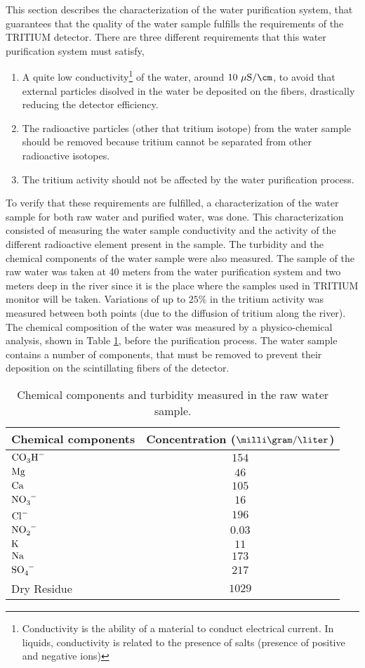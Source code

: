 This section describes the characterization of the water purification system, that guarantees that the quality of the water sample fulfills the requirements of the TRITIUM detector. There are three different requirements that this water purification system must satisfy,

\begin{enumerate}
\item{} A quite low conductivity\footnote{Conductivity is the ability of a material to conduct electrical current. In liquids, conductivity is related to the presence of salts (presence of positive and negative ions)} of the water, around $10~\mu\text{S}/\cm$, to avoid that external particles disolved in the water be deposited on the fibers, drastically reducing the detector efficiency.

\item{} The radioactive particles (other that tritium isotope) from the water sample should be removed because tritium cannot be separated from other radioactive isotopes.

\item{} The tritium activity should not be affected by the water purification process. 

\end{enumerate}

To verify that these requirements are fulfilled, a characterization of the water sample for both raw water and purified water, was done. This characterization consisted of measuring the water sample conductivity and the activity of the different radioactive element present in the sample. The turbidity and the chemical components of the water sample were also measured. The sample of the raw water was taken at 40 meters from the water purification system and two meters deep in the river since it is the place where the samples used in TRITIUM monitor will be taken. Variations of up to $25\%$ in the tritium activity was measured between both points (due to the diffusion of tritium along the river). The chemical composition of the water was measured by a physico-chemical analysis, shown in Table \ref{tab:ChemicalComponentsRawWater}, before the purification process. The water sample contains a number of components, that must be removed to prevent their deposition on the scintillating fibers of the detector.


\begin{table}[htbp]
\centering{}%
\begin{tabular}{lc}
\toprule 
Chemical components & Concentration ($\milli\gram/\liter$) \tabularnewline
\midrule
\midrule 
$\ce{CO_{3}H^-}$ & $154$ \tabularnewline
$\ce{Mg}$ & $46$ \tabularnewline
$\ce{Ca}$ & $105$ \tabularnewline
$\ce{NO_{3}^-}$ & $16$ \tabularnewline
$\ce{Cl^-}$ & $196$ \tabularnewline
$\ce{NO_{2}^-}$ & $0.03$ \tabularnewline
$\ce{K}$ & $11$ \tabularnewline
$\ce{Na}$ & $173$ \tabularnewline
$\ce{SO_{4}^-}$ & $217$ \tabularnewline
Dry Residue & $1029$ \tabularnewline
\bottomrule
\end{tabular}
\caption{Chemical components and turbidity measured in the raw water sample.}
\label{tab:ChemicalComponentsRawWater}
\end{table}

